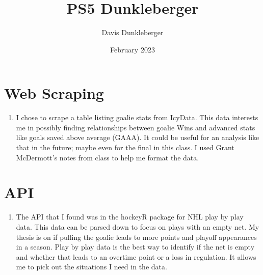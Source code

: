 \documentclass{article}
\title{PS5 Dunkleberger}
\author{Davis Dunkleberger}
\date{February 2023}
\begin{document}
\maketitle

\section{Web Scraping}
\begin{enumerate}
    \item I chose to scrape a table listing goalie stats from IcyData. This data interests me in possibly finding  relationships between goalie Wins and advanced stats like goals saved above average (GAAA). It could be useful for an analysis like that in the future; maybe even for the final in this class. I used Grant McDermott's notes from class to help me format the data. 
\end{enumerate}

\section{API}
\begin{enumerate}
    \item The API that I found was in the hockeyR package for NHL play by play data. This data can be parsed down to focus on plays with an empty net. My thesis is on if pulling the goalie leads to more points and playoff appearances in a season. Play by play data is the best way to identify if the net is empty and whether that leads to an overtime point or a loss in regulation. It allows me to pick out the situations I need in the data. 
\end{enumerate}
\end{document}
